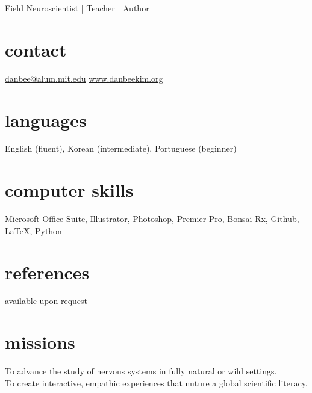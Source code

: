 \documentclass[]{friggeri-cv}
\begin{document}
       {Field Neuroscientist | Teacher | Author}


\begin{aside}
  \section{contact}
    \href{mailto:danbee@alum.mit.edu}{danbee@alum.mit.edu}
    \href{www.danbeekim.org}{www.danbeekim.org}
  \section{languages}
    English (fluent),
    Korean (intermediate),
    Portuguese (beginner)
  \section{computer skills}
    Microsoft Office Suite, 
	Illustrator, Photoshop, 
	Premier Pro, Bonsai-Rx, 
	Github, \LaTeX, Python
  \section{references}
    available upon request        
\end{aside}

\section{missions}
To advance the study of nervous systems in fully natural or wild settings. \\
To create interactive, empathic experiences that nuture a global scientific literacy. 
\end{document}
